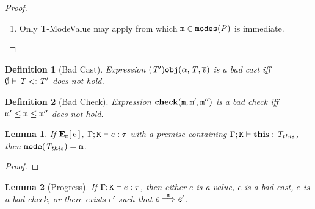 \documentclass[onecolumn,nocopyrightspace]{sigplanconf}
\newtheorem{lemma}{Lemma}
\newtheorem{definition}{Definition}
\theoremstyle{lessintrusive}
\theoremstyle{plain}
\theoremstyle{custom}
\theoremstyle{subcase-custom}
\begin{document}
\begin{proof}
\begin{enumerate}[(\arabic*)]
\item Only T-ModeValue may apply from which $\mathtt{m} \in \mathtt{modes}(\mathit{P})$ is immediate.

\end{enumerate} 

\end{proof}

\begin{definition}[Bad Cast]
Expression $(\mathit{T}') \mathtt{obj}(\alpha,\mathit{T},\overline{\mathit{v}})$ is a bad cast iff $\emptyset \vdash \mathit{T} \mathbin{<\vcentcolon} \mathit{T}'$ does not hold.
\label{pf:badcast}
\end{definition}

\begin{definition}[Bad Check]
Expression $\texttt{\bf check}(\mathtt{m},\mathtt{m}',\mathtt{m}'')$ is a bad check iff $\mathtt{m}' \leq \mathtt{m} \leq \mathtt{m}''$ does not hold.
\label{pf:badcheck}
\end{definition} 

\begin{lemma}
\label{pf:this-equals-context-mode}
If ${\bf E}_{\mathtt{m}}[\, e \,]$, $\Gamma;\mathtt{K}\vdash e:\tau$ with a premise containing $\Gamma;\mathtt{K}\vdash\texttt{\bf this}:\mathit{T}_{this}$, then $\mathtt{mode}(\mathit{T}_{this}) = \mathtt{m}$.
\end{lemma} 

\begin{proof}
\end{proof} 

\begin{lemma}[Progress]
\label{pf:progress}
If $\Gamma;\mathtt{K} \vdash e : \tau$, then either $e$ is a value, $e$ is a bad cast, $e$ is a bad check, or there exists $e'$ such that $e \stackrel{\mathtt{m}}{\Longrightarrow} e'$.
\end{lemma}
\end{document}

